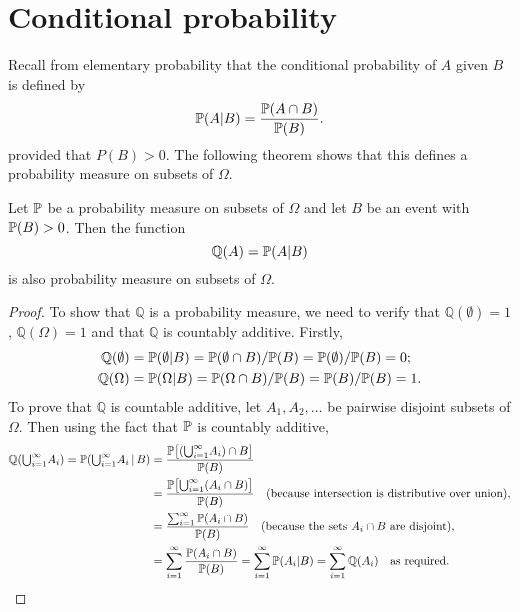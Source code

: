 
\section{Conditional probability}\label{sec:cond_prob}

Recall from elementary probability that the conditional probability of $A$ given $B$ is defined by
\[
\mathbb{P}(A|B) = \frac{\mathbb{P}(A\cap B)}{\mathbb{P}(B)}.
\]
provided that $P(B)>0$. The following theorem shows that this defines a probability measure on subsets of $\Omega$.

\begin{theorem}
Let $\mathbb{P}$ be a probability measure on subsets of $\Omega$ and let $B$ be an event with $\mathbb{P}(B)>0$. Then the function
\[
\mathbb{Q}(A) = \mathbb{P}(A|B)
\]
is also probability measure on subsets of $\Omega$.

\begin{proof}
To show that $\mathbb{Q}$ is a probability measure, we need to verify that $\mathbb{Q}(\emptyset) = 1$, $\mathbb{Q}(\Omega) = 1$ and that $\mathbb{Q}$ is countably additive. Firstly,
\begin{align*}
\mathbb{Q}(\emptyset) 
	& = \mathbb{P}(\emptyset|B) = \mathbb{P}(\emptyset\cap B)/\mathbb{P}(B) = \mathbb{P}(\emptyset)/\mathbb{P}(B) = 0; \\
\mathbb{Q}(\Omega) 
	& = \mathbb{P}(\Omega|B) = \mathbb{P}(\Omega\cap B)/\mathbb{P}(B) = \mathbb{P}(B)/\mathbb{P}(B) = 1.
\end{align*}
To prove that $\mathbb{Q}$ is countable additive, let $A_1,A_2,\ldots$ be pairwise disjoint subsets of $\Omega$. Then using the fact that $\mathbb{P}$ is countably additive,
\begin{align*}
\mathbb{Q}({\textstyle\bigcup}_{i=1}^{\infty} A_i) 
	= \mathbb{P}({\textstyle\bigcup}_{i=1}^{\infty} A_i\,|\,B)
	& = \frac{\mathbb{P}\big[({\textstyle\bigcup}_{i=1}^{\infty} A_i) \cap B\big]}{\mathbb{P}(B)} \\
	& = \frac{\mathbb{P}\big[{\textstyle\bigcup}_{i=1}^{\infty} (A_i \cap B)\big]}{\mathbb{P}(B)} \quad\text{(because intersection is distributive over union)},\\
	& = \frac{\sum_{i=1}^{\infty} \mathbb{P}(A_i \cap B)}{\mathbb{P}(B)} \quad\text{(because the sets $A_i\cap B$ are disjoint)}, \\
	& = \sum_{i=1}^{\infty}\frac{\mathbb{P}(A_i \cap B)}{\mathbb{P}(B)}
	  = \sum_{i=1}^{\infty}\mathbb{P}(A_i|B)
		= \sum_{i=1}^{\infty} \mathbb{Q}(A_i)\quad\text{as required.}
\end{align*}
\end{proof}
\end{theorem}

